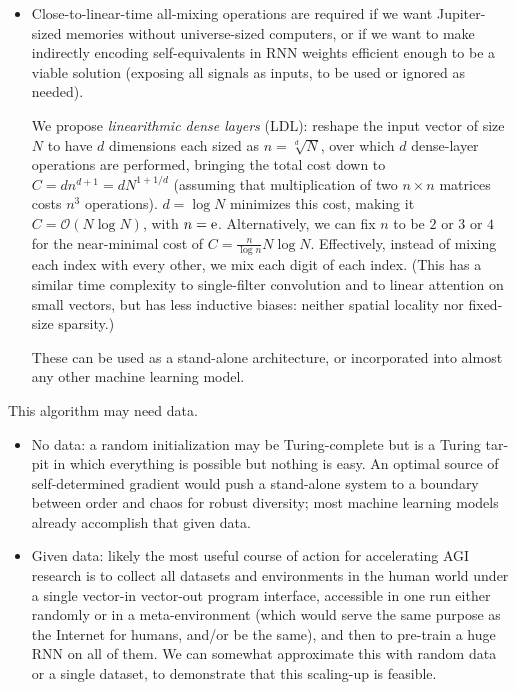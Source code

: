\documentclass{article}
\begin{document}
\begin{itemize}
\item Close-to-linear-time all-mixing operations are required if we want Jupiter-sized memories without universe-sized computers, or if we want to make indirectly encoding self-equivalents in RNN weights efficient enough to be a viable solution (exposing all signals as inputs, to be used or ignored as needed).

We propose \textit{linearithmic dense layers} (LDL): reshape the input vector of size $N$ to have $d$ dimensions each sized as $n=\sqrt[d]{N}$, over which $d$ dense-layer operations are performed, bringing the total cost down to $C=dn^{d+1}=d N^{1+1/d}$ (assuming that multiplication of two $n \times n$ matrices costs $n^3$ operations). $d=\log{N}$ minimizes this cost, making it $C=\mathcal{O}(N \log{N})$, with $n={\rm e}$. Alternatively, we can fix $n$ to be $2$ or $3$ or $4$ for the near-minimal cost of $C=\frac{n}{\log{n}} N \log{N}$. Effectively, instead of mixing each index with every other, we mix each digit of each index. (This has a similar time complexity to single-filter convolution and to linear attention \cite{vaswani2017attention} on small vectors, but has less inductive biases: neither spatial locality nor fixed-size sparsity.)

These can be used as a stand-alone architecture, or incorporated into almost any other machine learning model.
\end{itemize}

This algorithm may need data.
\begin{itemize}
\item No data: a random initialization may be Turing-complete but is a Turing tar-pit \cite{10.1145/947955.1083808} in which everything is possible but nothing is easy. An optimal source of self-determined gradient would push a stand-alone system to a boundary between order and chaos \cite{feng2020optimal} for robust diversity; most machine learning models already accomplish that given data.
\item Given data: likely the most useful course of action for accelerating AGI research is to collect all datasets and environments in the human world under a single vector-in vector-out program interface, accessible in one run either randomly or in a meta-environment (which would serve the same purpose as the Internet for humans, and/or be the same), and then to pre-train a huge RNN on all of them. We can somewhat approximate this with random data or a single dataset, to demonstrate that this scaling-up is feasible.
\end{itemize}
\end{document}
